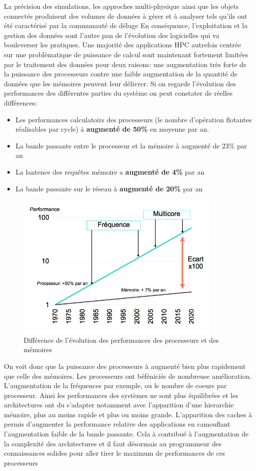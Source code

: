 La précision des simulations, les approches multi-physique ainsi que les objets connectés produisent des volumes de données à gérer et à analyser tels qu’ils ont été caractérisé par la communauté de déluge %
En conséquence, l’exploitation et la gestion des données sont l’autre pan de l’évolution des logicielles qui va bouleverser les pratiques. Une majorité des applications HPC autrefois centrée sur une problématique de puissance de calcul sont maintenant fortement limitées par le traitement des données pour deux raisons: une augmentation très forte de la puissance des processeurs contre une faible augmentation de la quantité de données que les mémoires peuvent leur délivrer. Si on regarde l'évolution des performances des différentes parties du système on peut constater de réelles différences:
\begin{itemize}
    \item Les performances calculatoirs des processeurs (le nombre d'opération flotantes réalisables par cycle) à \textbf{augmenté de 50\%} en moyenne par an.
    \item La bande passante entre le processeur et la mémoire à augmenté de 23\% par an
    \item La lantence des requêtes mémoire a \textbf{augmenté de 4\% }par an
    \item La bande passante sur le réseau à \textbf{augmenté de 20\%} par an
\end{itemize}

\begin{figure}
    \center
    \includegraphics[width=10cm]{images/Chapitre1/memory_gap.png}
    \caption{\label{pic_memory_gap} Différence de l'évolution des performances des processeurs et des mémoires }
\end{figure}

On voit donc que la puissance des processeurs à augmenté bien plus rapidement que celle des mémoires. Les processeurs ont béféniciés de nombreuse amélioration. L'augmentation de la fréquences par exemple, ou le nombre de coeurs par processeur. Ainsi les performances des systèmes ne sont plus équilibrées et les architectures ont du s'adapter notamment avec l'apparition d'une hierarchie mémoire, plus au moins rapide et plus ou moins grande. L'apparition des caches à permis d'augmenter la performance relative des applications en camouflant l'augmentation faible de la bande passante. Cela à contribué à l'augmentation de la complexité des architectures et il faut désormais au programmeur des connaissances solides pour aller tirer le maximum de performances de ces processeurs

